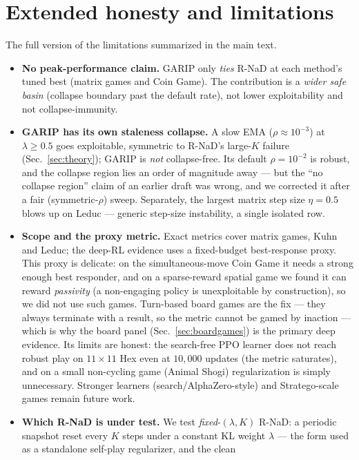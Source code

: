 \documentclass[10pt,twocolumn]{article}
\theoremstyle{plain}
\theoremstyle{remark}
\begin{document}
\section{Extended honesty and limitations}
\label{app:limits}
The full version of the limitations summarized in the main text.
\begin{itemize}
  \item \textbf{No peak-performance claim.} GARIP only \emph{ties} R-NaD at each
  method's tuned best (matrix games and Coin Game). The contribution is a
  \emph{wider safe basin} (collapse boundary past the default rate), not lower
  exploitability and not collapse-immunity.
  \item \textbf{GARIP has its own staleness collapse.} A slow EMA
  ($\rho\!\approx\!10^{-3}$) at $\lambda\!\ge\!0.5$ goes exploitable, symmetric to
  R-NaD's large-$K$ failure (Sec.~\ref{sec:theory}); GARIP is \emph{not}
  collapse-free. Its default $\rho\!=\!10^{-2}$ is robust, and the collapse region
  lies an order of magnitude away --- but the ``no collapse region'' claim of an
  earlier draft was wrong, and we corrected it after a fair (symmetric-$\rho$)
  sweep. Separately, the largest matrix step size $\eta\!=\!0.5$ blows up on
  Leduc --- generic step-size instability, a single isolated row.
  \item \textbf{Scope and the proxy metric.} Exact metrics cover matrix games,
  Kuhn and Leduc; the deep-RL evidence uses a fixed-budget best-response proxy.
  This proxy is delicate: on the simultaneous-move Coin Game it needs a strong
  enough best responder, and on a sparse-reward spatial game we found it can
  reward \emph{passivity} (a non-engaging policy is unexploitable by
  construction), so we did not use such games. Turn-based board games are the fix
  --- they always terminate with a result, so the metric cannot be gamed by
  inaction --- which is why the board panel (Sec.~\ref{sec:boardgames}) is the
  primary deep evidence. Its limits are honest: the search-free PPO learner does
  not reach robust play on $11\times11$ Hex even at $10{,}000$ updates (the metric
  saturates), and on a small non-cycling game (Animal Shogi) regularization is
  simply unnecessary. Stronger learners (search/AlphaZero-style) and
  Stratego-scale games remain future work.
  \item \textbf{Which R-NaD is under test.} We test \emph{fixed}-$(\lambda,K)$
  R-NaD: a periodic snapshot reset every $K$ steps under a constant KL weight
  $\lambda$ --- the form used as a standalone self-play regularizer, and the clean

\end{itemize}
\end{document}
